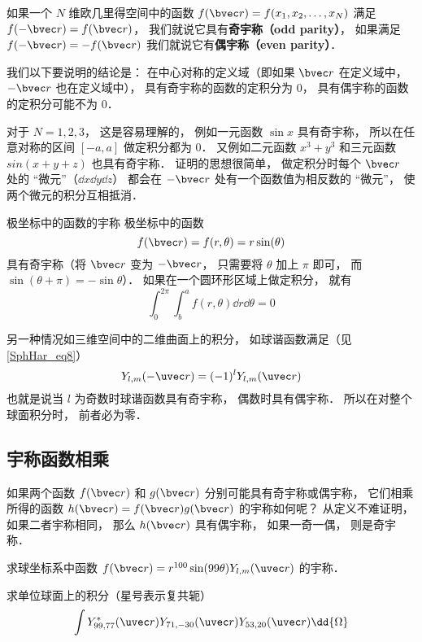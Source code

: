 

如果一个 $N$ 维欧几里得空间中的函数 $f(\bvec r) = f(x_1, x_2, \dots, x_N)$ 满足  $f(-\bvec r) = f(\bvec r)$， 我们就说它具有\textbf{奇宇称（odd parity）}， 如果满足  $f(-\bvec r) = -f(\bvec r)$ 我们就说它有\textbf{偶宇称（even parity）}．

我们以下要说明的结论是： 在中心对称的定义域（即如果 $\bvec r$ 在定义域中， $-\bvec r$ 也在定义域中）， 具有奇宇称的函数的定积分为 0， 具有偶宇称的函数的定积分可能不为 0．

对于 $N = 1, 2, 3$， 这是容易理解的， 例如一元函数 $\sin x$ 具有奇宇称， 所以在任意对称的区间 $[-a, a]$ 做定积分都为 0． 又例如二元函数 $x^3 + y^3$ 和三元函数 $sin(x + y + z)$ 也具有奇宇称． 证明的思想很简单， 做定积分时每个 $\bvec r$ 处的 “微元”（$\dd{x}\dd{y}\dd{z}$） 都会在 $-\bvec r$ 处有一个函数值为相反数的 “微元”， 使两个微元的积分互相抵消．

\begin{example}{极坐标中的函数的宇称}
极坐标中的函数
\begin{equation}\label{IntPry_eq1}
f(\bvec r) = f(r, \theta) = r\sin(\theta)
\end{equation}
具有奇宇称（将 $\bvec r$ 变为 $-\bvec r$， 只需要将 $\theta$ 加上 $\pi$ 即可， 而 $\sin(\theta + \pi) = -\sin\theta$）． 如果在一个圆环形区域上做定积分， 就有
\begin{equation}
\int_0^{2\pi} \int_b^a f(r, \theta) \dd{r} \dd{\theta} = 0
\end{equation}
\end{example}

另一种情况如三维空间中的二维曲面上的积分， 如球谐函数满足（见\autoref{SphHar_eq8}）
\begin{equation}\label{IntPry_eq3}
Y_{l,m}(-\uvec r) = (-1)^l Y_{l,m}(\uvec r)
\end{equation}
也就是说当 $l$ 为奇数时球谐函数具有奇宇称， 偶数时具有偶宇称． 所以在对整个球面积分时， 前者必为零．

\subsection{宇称函数相乘}
如果两个函数 $f(\bvec r)$ 和 $g(\bvec r)$ 分别可能具有奇宇称或偶宇称， 它们相乘所得的函数 $h(\bvec r) = f(\bvec r) g(\bvec r)$ 的宇称如何呢？ 从定义不难证明， 如果二者宇称相同， 那么 $h(\bvec r)$ 具有偶宇称， 如果一奇一偶， 则是奇宇称．

\begin{exercise}{}
求球坐标系中函数 $f(\bvec r) = r^{100}\sin(99\theta) Y_{l, m}(\uvec r)$ 的宇称．
\end{exercise}

\begin{exercise}{}
求单位球面上的积分（星号表示复共轭）
\begin{equation}
\int Y_{99, 77}^*(\uvec r) Y_{71, -30}(\uvec r) Y_{53, 20}(\uvec r) \dd{\Omega}
\end{equation}
\end{exercise}
